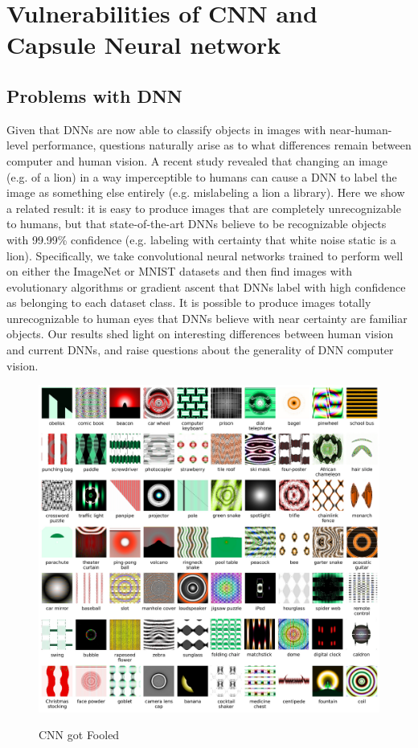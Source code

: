\documentclass[12pt]{article}
\begin{document}
{{\section{\fontsize{14}{14}\selectfont Vulnerabilities of CNN and Capsule Neural network}   
\subsection{Problems with DNN}
 Given that DNNs are now able to classify objects in images with near-human-level performance, questions naturally arise as to what differences remain between computer and human vision. A recent study revealed that changing an image (e.g. of a lion) in a way imperceptible to humans can cause a DNN to label the image as something else entirely (e.g. mislabeling a lion a library). Here we show a related result: it is easy to produce images that are completely unrecognizable to humans, but that state-of-the-art DNNs believe to be recognizable objects with 99.99\% confidence (e.g. labeling with certainty that white noise static is a lion). Specifically, we take convolutional neural networks trained to perform well on either the ImageNet or MNIST datasets and then find images with evolutionary algorithms or gradient ascent that DNNs label with high confidence as belonging to each dataset class. It is possible to produce images totally unrecognizable to human eyes that DNNs believe with near certainty are familiar objects. Our results shed light on interesting differences between human vision and current DNNs, and raise questions about the generality of DNN computer vision.
 
 \begin{figure}[h]
    	\centering
    	\includegraphics[width=1\textwidth]{fooled.jpg}
       	\label{fig:mesh20}
	 	 \caption{CNN got Fooled}
	\end{figure} 
 
}}
\end{document}
